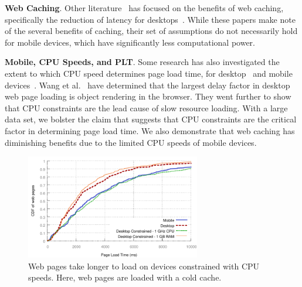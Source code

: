 \textbf{Web Caching}. Other literature~\cite{web-caching-1, web-caching-2, web-caching-8, web-caching-9} has focused on the benefits of web caching, specifically the reduction of latency for desktops~\cite{web-caching-3, web-caching-4, web-caching-5, web-caching-6, web-caching-7}.
While these papers make note of the several benefits of caching, their set of assumptions do not necessarily hold for mobile devices, which have significantly less computational power. 

\textbf{Mobile, CPU Speeds, and PLT}.
Some research has also investigated the extent to which CPU speed determines page load time, for desktop~\cite{CPU-plt-1} and mobile devices~\cite{CPU-plt-2, CPU-plt-3}.
Wang et al.~\cite{CPU-plt-2, CPU-plt-3} have determined that the largest delay factor in desktop web page loading is object rendering in the browser. They went further to show that CPU constraints are the lead cause of slow resource loading. 
With a large data set, we bolster the claim that suggests that CPU constraints are the critical factor in determining page load time. We also demonstrate that web caching has diminishing benefits due to the limited CPU speeds of mobile devices.
\begin{figure}[t]
    \includegraphics[width=3in]{../graphs/plt_comparison/plt_differences.pdf}
    \caption[]{\label{fig:plt_differences}Web pages take longer to load on devices constrained with CPU speeds. Here, web pages are loaded with a cold cache.}
\end{figure}

